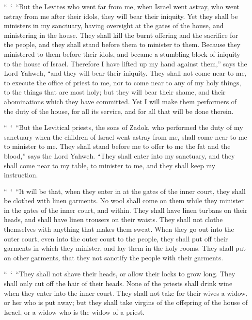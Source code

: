 {\par }{\PP {}“ ‘ “But the Levites who went far from me, when Israel went astray, who went astray from me after their idols, they will bear their iniquity.
Yet they shall be ministers in my sanctuary, having oversight at the gates of the house, and ministering in the house. They shall kill the burnt offering and the sacrifice for the people, and they shall stand before them to minister to them.
Because they ministered to them before their idols, and became a stumbling block of iniquity to the house of Israel. Therefore I have lifted up my hand against them,” says the Lord Yahweh, “and they will bear their iniquity.
They shall not come near to me, to execute the office of priest to me, nor to come near to any of my holy things, to the things that are most holy; but they will bear their shame, and their abominations which they have committed.
Yet I will make them performers of the duty of the house, for all its service, and for all that will be done therein.
\par }{\PP {}“ ‘ “But the Levitical priests, the sons of Zadok, who performed the duty of my sanctuary when the children of Israel went astray from me, shall come near to me to minister to me. They shall stand before me to offer to me the fat and the blood,” says the Lord Yahweh.
“They shall enter into my sanctuary, and they shall come near to my table, to minister to me, and they shall keep my instruction.
\par }{\PP {}“ ‘ “It will be that, when they enter in at the gates of the inner court, they shall be clothed with linen garments. No wool shall come on them while they minister in the gates of the inner court, and within.
They shall have linen turbans on their heads, and shall have linen trousers on their waists. They shall not clothe themselves with anything that makes them sweat.
When they go out into the outer court, even into the outer court to the people, they shall put off their garments in which they minister, and lay them in the holy rooms. They shall put on other garments, that they not sanctify the people with their garments.
\par }{\PP {}“ ‘ “They shall not shave their heads, or allow their locks to grow long. They shall only cut off the hair of their heads.
None of the priests shall drink wine when they enter into the inner court.
They shall not take for their wives a widow, or her who is put away; but they shall take virgins of the offspring of the house of Israel, or a widow who is the widow of a priest.
}
